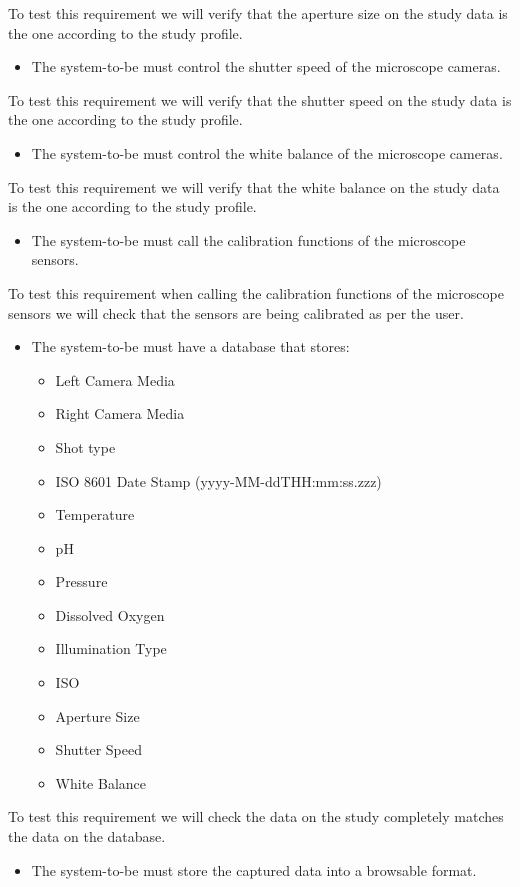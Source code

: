 To test this requirement we will verify that the aperture size on the study data is the one according to the study profile.
\begin{itemize}
    \item The system-to-be must control the shutter speed of the microscope cameras.
\end{itemize}
To test this requirement we will verify that the shutter speed on the study data is the one according to the study profile.
\begin{itemize}
    \item The system-to-be must control the white balance of the microscope cameras.
\end{itemize}
To test this requirement we will verify that the white balance on the study data is the one according to the study profile.
\begin{itemize}
    \item The system-to-be must call the calibration functions of the microscope sensors.
\end{itemize}
To test this requirement when calling the calibration functions of the microscope sensors we will check that the sensors are being calibrated as per the user.
\begin{itemize}
    \item The system-to-be must have a database that stores:
    \begin{itemize}
        \item Left Camera Media
        \item Right Camera Media
        \item Shot type
        \item ISO 8601 Date Stamp (yyyy-MM-ddTHH:mm:ss.zzz)
        \item Temperature
        \item pH
        \item Pressure
        \item Dissolved Oxygen
        \item Illumination Type
        \item ISO
        \item Aperture Size
        \item Shutter Speed
        \item White Balance
    \end{itemize}
\end{itemize}
To test this requirement we will check the data on the study completely matches the data on the database.
\begin{itemize}
    \item The system-to-be must store the captured data into a browsable format.
\end{itemize}
